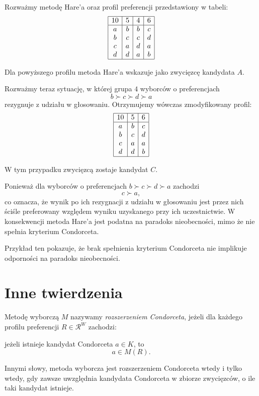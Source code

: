 \documentclass[12pt,a4paper]{mwrep}
\begin{document}
	\begin{example}
		Rozważmy metodę Hare'a oraz profil preferencji przedstawiony w tabeli:
		\[
		\begin{array}{|c|c|c|c|}
			\hline
			10 & 5 & 4 & 6\\
			\hline
			a & b & b & c\\
			b & c & c & d\\
			c & a & d & a\\
			d & d & a & b\\
			\hline
		\end{array}
		\]
		
		Dla powyższego profilu metoda Hare'a wskazuje jako zwycięzcę kandydata \(A\).
		
		Rozważmy teraz sytuację, w której grupa \(4\) wyborców o preferencjach
		\[
		b \succ c \succ d \succ a
		\]
		rezygnuje z udziału w głosowaniu. Otrzymujemy wówczas zmodyfikowany profil:
		\[
		\begin{array}{|c|c|c|}
			\hline
			10 & 5 & 6\\
			\hline
			a & b & c\\
			b & c & d\\
			c & a & a\\
			d & d & b\\
			\hline
		\end{array}
		\]
		
		W tym przypadku zwycięzcą zostaje kandydat \(C\).
		
		Ponieważ dla wyborców o preferencjach \(b \succ c \succ d \succ a\) zachodzi
		\[
		c \succ a,
		\]
		co oznacza, że wynik po ich rezygnacji z udziału w głosowaniu jest przez nich ściśle preferowany względem wyniku uzyskanego przy ich uczestnictwie. W konsekwencji metoda Hare'a jest podatna na paradoks nieobecności, mimo że nie spełnia kryterium Condorceta.
	\end{example}
	
	Przykład ten pokazuje, że brak spełnienia kryterium Condorceta nie implikuje odporności na paradoks nieobecności.
	
	\section{Inne twierdzenia}
	
	\begin{definition}
		\label{def:condorcet-extension}
		Metodę wyborczą \(M\) nazywamy \textit{rozszerzeniem Condorceta}, jeżeli dla każdego profilu preferencji \(R \in \mathcal{R}^{W}\) zachodzi:
		
		jeżeli istnieje kandydat Condorceta \(a \in K\), to
		\[
		a \in M(R).
		\]
		
		Innymi słowy, metoda wyborcza jest rozszerzeniem Condorceta wtedy i tylko wtedy, gdy zawsze uwzględnia kandydata Condorceta w zbiorze zwycięzców, o ile taki kandydat istnieje.
	\end{definition}
\end{document}
